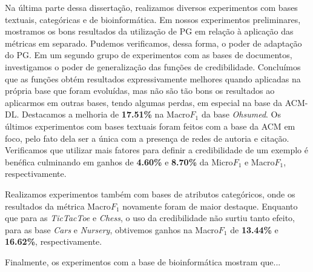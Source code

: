 Na última parte dessa dissertação, realizamos diversos experimentos com bases textuais, categóricas e de bioinformática. Em nossos experimentos preliminares, mostramos os bons resultados da utilização de \textsc{PG} em relação à aplicação das métricas em separado. Pudemos verificamos, dessa forma, o poder de adaptação do \textsc{PG}.
Em um segundo grupo de experimentos com as bases de documentos, investigamos o poder de generalização das funções de credibilidade. Concluímos que as funções obtém resultados expressivamente melhores quando aplicadas na própria base que foram evoluídas, mas não são tão bons os resultados ao aplicarmos em outras bases, tendo algumas perdas, em especial na base da \textsc{ACM-DL}.
Destacamos a melhoria de \textbf{17.51\%} na Macro$F_1$ da base \textit{Ohsumed}.
Os últimos experimentos com bases textuais foram feitos com a base da \textsc{ACM} em foco, pelo fato dela ser a única com a presença de redes de autoria e citação. Verificamos que utilizar mais fatores para definir a credibilidade de um exemplo é benéfica culminando em ganhos de \textbf{4.60\%} e \textbf{8.70\%} da Micro$F_1$ e Macro$F_1$, respectivamente.

Realizamos experimentos também com bases de atributos categóricos, onde os resultados da métrica Macro$F_1$ novamente foram de maior destaque. Enquanto que para as \textit{TicTacToe} e \textit{Chess}, o uso da credibilidade não surtiu tanto efeito, para as base \textit{Cars} e \textit{Nursery}, obtivemos ganhos na Macro$F_1$ de \textbf{13.44\%} e \textbf{16.62\%}, respectivamente.

Finalmente, os experimentos com a base de bioinformática mostram que...


